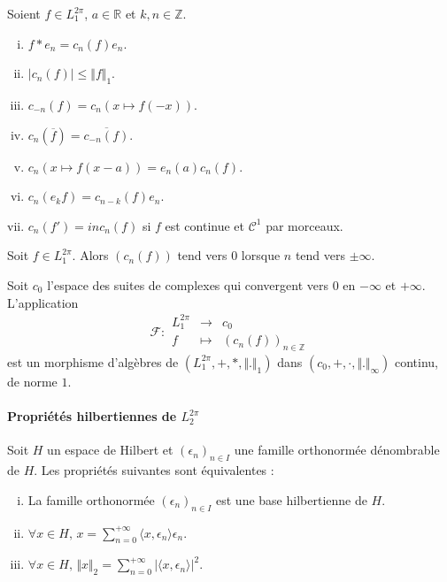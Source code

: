 	\begin{proposition}
		Soient $f \in L_1^{2 \pi}$, $a \in \mathbb{R}$ et $k, n \in \mathbb{Z}$.
		\begin{enumerate}[(i)]
			\item $f * e_n = c_n(f) e_n$.
			\item $\vert c_n(f) \vert \leq \Vert f \Vert_1$.
			\item $c_{-n}(f) = c_n(x \mapsto f(-x))$.
			\item $c_n(\overline{f}) = \overline{c_{-n}(f)}$.
			\item $c_n(x \mapsto f(x-a)) = e_n(a) c_n(f)$.
			\item $c_n(e_k f) = c_{n-k}(f) e_n$.
			\item $c_n(f') = in c_n(f)$ si $f$ est continue et $\mathcal{C}^1$ par morceaux.
		\end{enumerate}
	\end{proposition}


	\begin{lemma}
		Soit $f \in L_1^{2 \pi}$. Alors $(c_n(f))$ tend vers $0$ lorsque $n$ tend vers $\pm \infty$.
	\end{lemma}

	\begin{theorem}
		\label{246-1}
		Soit $c_0$ l'espace des suites de complexes qui convergent vers $0$ en $-\infty$ et $+\infty$. L'application
		\[
		\mathcal{F} :
		\begin{array}{ccc}
			L_1^{2\pi} &\rightarrow& c_0 \\
			f &\mapsto& (c_n(f))_{n \in \mathbb{Z}}
		\end{array}
		\]
		est un morphisme d'algèbres de $(L_1^{2\pi}, +, *, \Vert . \Vert_1)$ dans $(c_0, +, \cdot, \Vert . \Vert_\infty)$ continu, de norme $1$.
	\end{theorem}

	\paragraph{Propriétés hilbertiennes de \texorpdfstring{$L_2^{2 \pi}$}{L₂²ᵖⁱ}}


	\begin{theorem}
		\label{246-2}
		Soit $H$ un espace de Hilbert et $(\epsilon_n)_{n \in I}$ une famille orthonormée dénombrable de $H$. Les propriétés suivantes sont équivalentes :
		\begin{enumerate}[(i)]
			\item La famille orthonormée $(\epsilon_n)_{n \in I}$ est une base hilbertienne de $H$.
			\item $\forall x \in H, \, x = \sum_{n=0}^{+\infty} \langle x, \epsilon_n \rangle \epsilon_n$.
			\item \label{246-3} $\forall x \in H, \, \Vert x \Vert_2 = \sum_{n=0}^{+\infty} \vert \langle x, \epsilon_n \rangle \vert^2$.
		\end{enumerate}
	\end{theorem}

